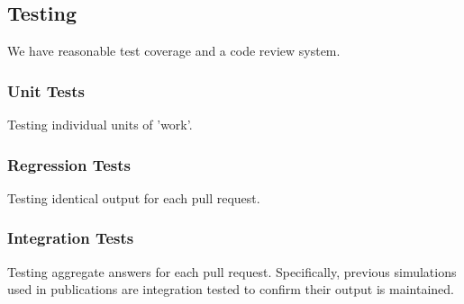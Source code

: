 \subsection{Testing}

We have reasonable test coverage and a code review system.

\subsubsection{Unit Tests}

Testing individual units of 'work'.

\subsubsection{Regression Tests}

Testing identical output for each pull request.

\subsubsection{Integration Tests} 

Testing aggregate answers for each pull request. Specifically, previous
simulations used in publications are integration tested to confirm their output
is maintained.

